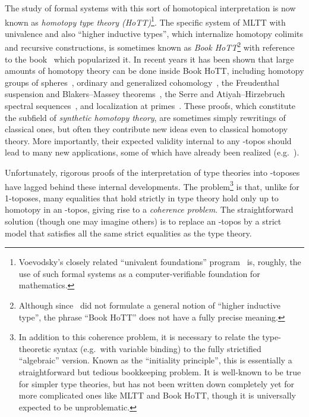 The study of formal systems with this sort of homotopical interpretation is now known as \emph{homotopy type theory (HoTT)}\footnote{Voevodsky's closely related ``univalent foundations'' program~\cite{vv:unimath} is, roughly, the use of such formal systems as a computer-verifiable foundation for mathematics.}.
The specific system of MLTT with univalence and also ``higher inductive types'', which internalize homotopy colimits and recursive constructions, is sometimes known as \emph{Book HoTT}\footnote{Although since~\cite{hottbook} did not formulate a general notion of ``higher inductive type'', the phrase ``Book HoTT'' does not have a fully precise meaning.} with reference to the book~\cite{hottbook} which popularized it.
In recent years it has been shown that large amounts of homotopy theory can be done inside Book HoTT, including homotopy groups of spheres~\cite{ls:pi1s1,lb:pinsn,brunerie:thesis}, ordinary and generalized cohomology~\cite{lf:emspaces,bf:cellcoh-hott,cavallo:cohom-hott,br:rp-hott}, the Freudenthal suspension and Blakers--Massey theorems~\cite{ffll:blakers-massey}, the Serre and Atiyah--Hirzebruch spectral sequences~\cite{floris:thesis}, and localization at primes~\cite{cors:loc-hott,scoccola:nilpfrac-hott}.
These proofs, which constitute the subfield of \emph{synthetic homotopy theory}, are sometimes simply rewritings of classical ones, but often they contribute new ideas even to classical homotopy theory.
More importantly, their expected validity internal to any \io-topos should lead to many new applications, some of which have already been realized (e.g.~\cite{abfj:gen-blakers-massey,abfj:goodwillie-htt}).

Unfortunately, rigorous proofs of the interpretation of type theories into \io-toposes have lagged behind these internal developments.
The problem\footnote{In addition to this coherence problem, it is necessary to relate the type-theoretic syntax (e.g.\ with variable binding) to the fully strictified ``algebraic'' version.
  Known as the ``initiality principle'', this is essentially a straightforward but tedious bookkeeping problem.
  It is well-known to be true for simpler type theories, but has not been written down completely yet for more complicated ones like MLTT and Book HoTT, though it is universally expected to be unproblematic.} is that, unlike for 1-toposes, many equalities that hold strictly in type theory hold only up to homotopy in an \io-topos, giving rise to a \emph{coherence problem}.
The straightforward solution (though one may imagine others) is to replace an \io-topos by a strict model that satisfies all the same strict equalities as the type theory.

